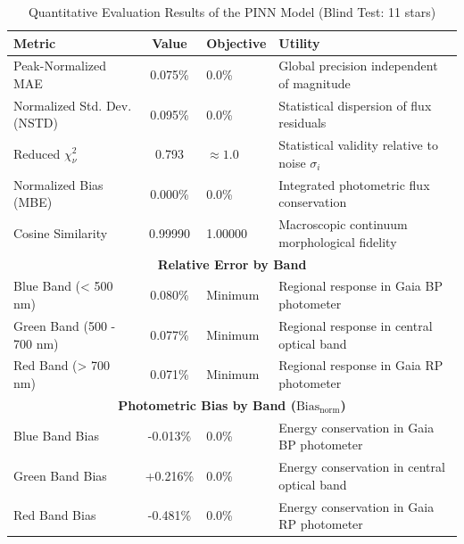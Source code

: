 
\begin{table}[htpb]
\centering
\caption{Quantitative Evaluation Results of the PINN Model (Blind Test: 11 stars)}
\label{tab:pinn_evaluation}
\begin{tabular}{lcll}
\hline
\textbf{Metric} & \textbf{Value} & \textbf{Objective} & \textbf{Utility} \\
\hline
Peak-Normalized MAE & 0.075\% & 0.0\% & Global precision independent of magnitude \\
Normalized Std. Dev. (NSTD) & 0.095\% & 0.0\% & Statistical dispersion of flux residuals \\
Reduced $\chi^2_\nu$ & 0.793 & $\approx 1.0$ & Statistical validity relative to noise $\sigma_i$ \\
Normalized Bias (MBE) & 0.000\% & 0.0\% & Integrated photometric flux conservation \\
Cosine Similarity & 0.99990 & 1.00000 & Macroscopic continuum morphological fidelity \\
\hline
\multicolumn{4}{c}{\textbf{Relative Error by Band}} \\
\hline
Blue Band (< 500 nm) & 0.080\% & Minimum & Regional response in Gaia BP photometer \\
Green Band (500 - 700 nm) & 0.077\% & Minimum & Regional response in central optical band \\
Red Band (> 700 nm) & 0.071\% & Minimum & Regional response in Gaia RP photometer \\
\hline
\multicolumn{4}{c}{\textbf{Photometric Bias by Band ($\text{Bias}_{\text{norm}}$)}} \\
\hline
Blue Band Bias & -0.013\% & 0.0\% & Energy conservation in Gaia BP photometer \\
Green Band Bias & +0.216\% & 0.0\% & Energy conservation in central optical band \\
Red Band Bias & -0.481\% & 0.0\% & Energy conservation in Gaia RP photometer \\
\hline
\end{tabular}
\end{table}

